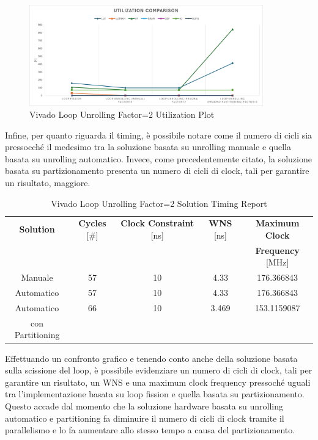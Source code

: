 \begin{figure}[H]
    \centering
    \includegraphics[width=0.9\textwidth]{solutions/loop_unrolling/factor2/loopunrollingfactor2utilization.png}
    \caption{Vivado Loop Unrolling Factor=2 Utilization Plot}
    \label{fig:vivado-loop-unrolling-factor2-utilization-plot}
\end{figure}

Infine, per quanto riguarda il timing, è possibile notare come il numero di cicli sia pressocché il medesimo tra la soluzione basata su unrolling manuale e quella basata su unrolling automatico. Invece, come precedentemente citato, la soluzione basata su partizionamento presenta un numero di cicli di clock, tali per garantire un risultato, maggiore.

\begin{table}[H]
    \centering
    \begin{tabular}{|c|c|c|c|c|}
        \hline
        \textbf{Solution} & \textbf{Cycles} [\#] & \textbf{Clock Constraint} [ns] & \textbf{WNS} [ns] & \textbf{Maximum Clock} \\
        & & & & \textbf{Frequency} [MHz] \\
        \hline
        Manuale & 57 & 10 & 4.33 & 176.366843 \\
        \hline
        Automatico & 57 & 10 & 4.33 & 176.366843 \\
        \hline
        Automatico & 66 & 10 & 3.469 & 153.1159087 \\
        con Partitioning & & & & \\
        \hline
    \end{tabular}
    \caption{Vivado Loop Unrolling Factor=2 Solution Timing Report}
    \label{tab:vivado-loop-unrolling-factor2-solution-timing-report}
\end{table}

Effettuando un confronto grafico e tenendo conto anche della soluzione basata sulla scissione del loop, è possibile evidenziare un numero di cicli di clock, tali per garantire un risultato, un WNS e una maximum clock frequency pressoché uguali tra l'implementazione basata su loop fission e quella basata su partizionamento. Questo accade dal momento che la soluzione hardware basata su unrolling automatico e partitioning fa diminuire il numero di cicli di clock tramite il parallelismo e lo fa aumentare allo stesso tempo a causa del partizionamento. 

